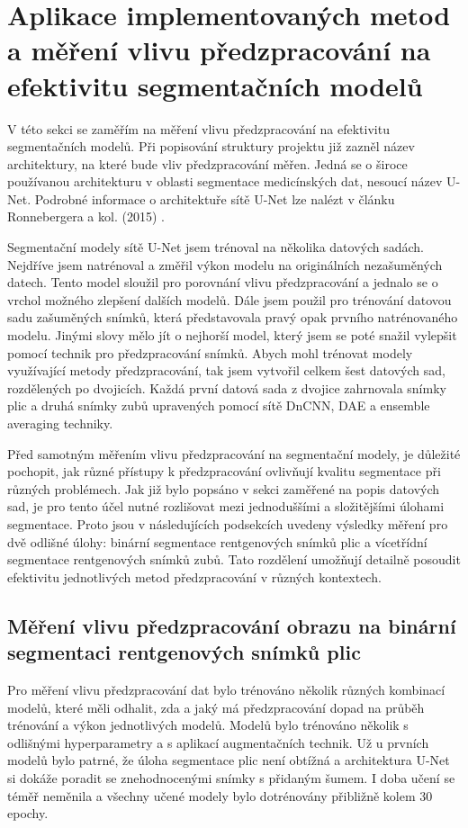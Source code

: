 \documentclass[male,czech,api_ing]{thesis}
\begin{document}
\section{Aplikace implementovaných metod a měření vlivu předzpracování na efektivitu segmentačních modelů}
V této sekci se zaměřím na měření vlivu předzpracování na efektivitu segmentačních modelů. Při popisování struktury projektu již zazněl název architektury, na které bude vliv předzpracování měřen. Jedná se o široce používanou architekturu v oblasti segmentace medicínských dat, nesoucí název U-Net. Podrobné informace o architektuře sítě U-Net lze nalézt v článku Ronnebergera a kol. (2015) \cite{UNET_paper}.

Segmentační modely sítě U-Net jsem trénoval na několika datových sadách. Nejdříve jsem natrénoval a změřil výkon modelu na originálních nezašuměných datech. Tento model sloužil pro porovnání vlivu předzpracování a jednalo se o vrchol možného zlepšení dalších modelů. Dále jsem použil pro trénování datovou sadu zašuměných snímků, která představovala pravý opak prvního natrénovaného modelu. Jinými slovy mělo jít o nejhorší model, který jsem se poté snažil vylepšit pomocí technik pro předzpracování snímků. Abych mohl trénovat modely využívající metody předzpracování, tak jsem vytvořil celkem šest datových sad, rozdělených po dvojicích. Každá první datová sada z dvojice zahrnovala snímky plic a druhá snímky zubů upravených pomocí sítě DnCNN, DAE a ensemble averaging techniky.

Před samotným měřením vlivu předzpracování na segmentační modely, je důležité pochopit, jak různé přístupy k předzpracování ovlivňují kvalitu segmentace při různých problémech. Jak již bylo popsáno v sekci zaměřené na popis datových sad, je pro tento účel nutné rozlišovat mezi jednoduššími a složitějšími úlohami segmentace. Proto jsou v následujících podsekcích uvedeny výsledky měření pro dvě odlišné úlohy: binární segmentace rentgenových snímků plic a vícetřídní segmentace rentgenových snímků zubů. Tato rozdělení umožňují detailně posoudit efektivitu jednotlivých metod předzpracování v různých kontextech.

\subsection{Měření vlivu předzpracování obrazu na binární segmentaci rentgenových snímků plic}
Pro měření vlivu předzpracování dat bylo trénováno několik různých kombinací modelů, které měli odhalit, zda a jaký má předzpracování dopad na průběh trénování a výkon jednotlivých modelů. Modelů bylo trénováno několik s odlišnými hyperparametry a s aplikací augmentačních technik. Už u prvních modelů bylo patrné, že úloha segmentace plic není obtížná a architektura U-Net si dokáže poradit se znehodnocenými snímky s přidaným šumem. I doba učení se téměř neměnila a všechny učené modely bylo dotrénovány přibližně kolem 30 epochy. 
\end{document}
